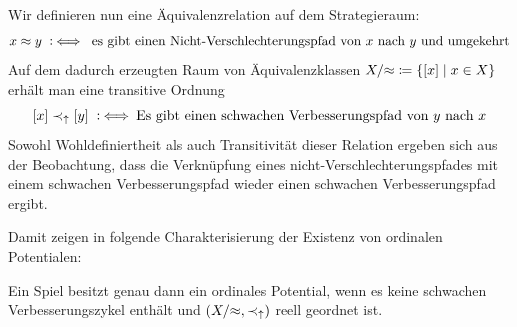 Wir definieren nun eine Äquivalenzrelation auf dem Strategieraum:
	\[x \approx y \mathbin{~\mathop:\!\!\iff} \text{ es gibt einen Nicht-Verschlechterungspfad von $x$ nach $y$ und umgekehrt}\]
Auf dem dadurch erzeugten Raum von Äquivalenzklassen $X/{\approx} \coloneqq \left\lbrace[x] \mid x \in X\right\rbrace$ erhält man eine transitive Ordnung
	\[[x] \prec_\uparrow [y] \mathbin{~\mathop:\!\!\iff} \text{Es gibt einen schwachen Verbesserungspfad von $y$ nach $x$}\]
Sowohl Wohldefiniertheit als auch Transitivität dieser Relation ergeben sich aus der Beobachtung, dass die Verknüpfung eines nicht-Verschlechterungspfades mit einem schwachen Verbesserungspfad wieder einen schwachen Verbesserungspfad ergibt.

Damit zeigen \citeauthor{CharExOrdPot} in \cite[Theorem 3.1]{CharExOrdPot} folgende Charakterisierung der Existenz von ordinalen Potentialen:

\begin{satz}\label{satz:CharOrdPot}
	Ein Spiel besitzt genau dann ein ordinales Potential, wenn es keine schwachen Verbesserungszykel enthält und $(X/{\approx}, \prec_\uparrow)$ reell geordnet ist.
\end{satz}

